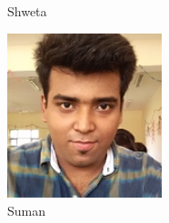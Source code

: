 \begin{frame}
\begin{figure}[ht]
\begin{minipage}[b]{0.23\linewidth}
            \caption{Shweta}
            \label{fig:c}
        \end{minipage}   
        \begin{minipage}[b]{0.23\linewidth}
            \centering
            \includegraphics[width=0.4\textwidth]{ta_images/suman.jpg}
            \caption{Suman}
            \label{fig:c}
        \end{minipage} 
    \end{figure}
\end{frame}